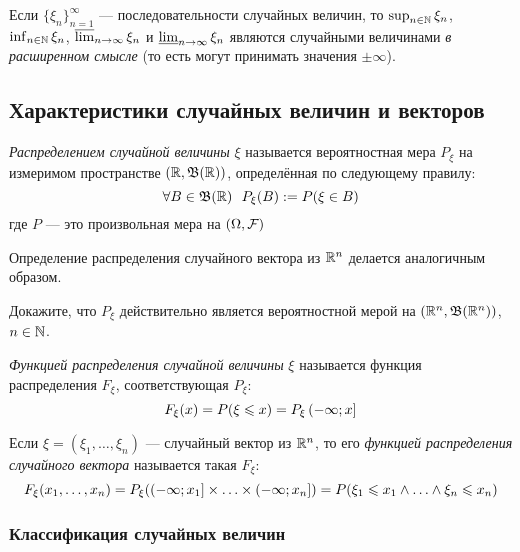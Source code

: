 \begin{proposition}
	Если $\{\xi_n\}_{n = 1}^\infty$ --- последовательности случайных величин, то $\sup_{n \in \mathbb{N}} \xi_n$, $\inf_{n \in \mathbb{N}} \xi_n$, $\varlimsup_{n \to \infty} \xi_n$ и $\varliminf_{n \to \infty} \xi_n$ являются случайными величинами \textit{в расширенном смысле} (то есть могут принимать значения $\pm\infty$).
\end{proposition}

\subsection{Характеристики случайных величин и векторов}

\begin{definition}
	\textit{Распределением случайной величины} $\xi$ называется вероятностная мера $P_\xi$ на измеримом пространстве $(\mathbb{R}, \mathfrak{B}(\mathbb{R}))$, определённая по следующему правилу:
	\[
		\forall B \in \mathfrak{B}(\mathbb{R})\ \  P_\xi(B) := P(\xi \in B)
	\]
	где $P$ --- это произвольная мера на $(\Omega, \mathcal{F})$
\end{definition}

\begin{note}
	Определение распределения случайного вектора из $\mathbb{R}^n$ делается аналогичным образом.
\end{note}

\begin{exercise}
	Докажите, что $P_\xi$ действительно является вероятностной мерой на $(\mathbb{R}^n, \mathfrak{B}(\mathbb{R}^n))$, $n \in \mathbb{N}$.
\end{exercise}

\begin{definition}
	\textit{Функцией распределения случайной величины} $\xi$ называется функция распределения $F_\xi$, соответствующая $P_\xi$:
	\[
		F_\xi(x) = P(\xi \leqslant x) = P_\xi\left(-\infty; x\right]
	\]
\end{definition}

\begin{definition}
	Если $\xi = (\xi_1, \ldots, \xi_n)$ --- случайный вектор из $\mathbb{R}^n$, то его \textit{функцией распределения случайного вектора} называется такая $F_\xi$:
	\[
		F_\xi(x_1, \ldots, x_n) = P_\xi(\left(-\infty; x_1\right] \times \ldots \times \left(-\infty; x_n\right]) = P(\xi_1 \leqslant x_1 \wedge \ldots \wedge \xi_n \leqslant x_n)
	\]
\end{definition}

\subsubsection*{Классификация случайных величин}

